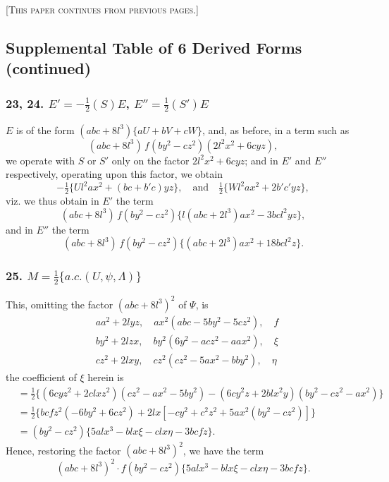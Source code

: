 \documentclass[11pt,a4paper]{book}
\begin{document}
\textsc{[This paper continues from previous pages.]}

\subsection*{Supplemental Table of 6 Derived Forms (continued)}

\subsubsection*{23, 24. $E' = -\frac{1}{2}(S)E$, $E'' = \frac{1}{2}(S')E$}

$E$ is of the form $(abc + 8l^3)\{aU + bV + cW\}$, and, as before, in a term such as
\[
(abc + 8l^3)\,f(by^2 - cz^2)(2l^2x^2 + 6cyz),
\]
we operate with $S$ or $S'$ only on the factor $2l^2x^2 + 6cyz$; and in $E'$ and $E''$ respectively, operating upon this factor, we obtain
\[
-\tfrac{1}{2}\{U l^2ax^2 + (bc + b'c)yz\},\quad \text{and}\quad \tfrac{1}{2}\{W l^2ax^2 + 2b'c'yz\},
\]
viz. we thus obtain in $E'$ the term
\[
(abc + 8l^3)\,f(by^2 - cz^2)\{l(abc + 2l^3)ax^2 - 3bcl^2yz\},
\]
and in $E''$ the term
\[
(abc + 8l^3)\,f(by^2 - cz^2)\{(abc + 2l^3)ax^2 + 18bcl^2z\}.
\]

\subsubsection*{25. $M = \frac{1}{2}\{a.c.(U, \psi, \Lambda)\}$}

This, omitting the factor $(abc + 8l^3)^2$ of $\Psi$, is
\[
\begin{aligned}
&aa^2 + 2lyz,\quad ax^2(abc - 5by^2 - 5cz^2),\quad f \\
&by^2 + 2lzx,\quad by^2(6y^2 - acz^2 - aax^2),\quad \xi \\
&cz^2 + 2lxy,\quad cz^2(cz^2 - 5ax^2 - bby^2),\quad \eta
\end{aligned}
\]
the coefficient of $\xi$ herein is
\[
\begin{aligned}
&= \tfrac{1}{2}\{(6cyz^2 + 2clxz^2)(cz^2 - ax^2 - 5by^2) - (6cy^2z + 2blx^2y)(by^2 - cz^2 - ax^2)\}\\
&= \tfrac{1}{2}\{bcfz^2(-6by^2 + 6cz^2) + 2lx[-cy^2 + c^2z^2 + 5ax^2(by^2 - cz^2)]\}\\
&= (by^2 - cz^2)\{5alx^3 - blx\xi - clx\eta - 3bcfz\}.
\end{aligned}
\]
Hence, restoring the factor $(abc + 8l^3)^2$, we have the term
\[
(abc + 8l^3)^2 \cdot f(by^2 - cz^2)\{5alx^3 - blx\xi - clx\eta - 3bcfz\}.
\]
\end{document}
